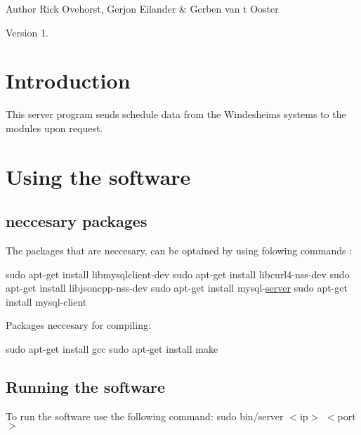 \begin{DoxyAuthor}{Author}
Rick Ovehorst, Gerjon Eilander \& Gerben van \textquotesingle{}t Ooster 
\end{DoxyAuthor}
\begin{DoxyVersion}{Version}
1. 
\end{DoxyVersion}
\hypertarget{index_intro_sec}{}\section{Introduction}\label{index_intro_sec}
This server program sends schedule data from the Windesheim\textquotesingle{}s systems to the modules upon request.\hypertarget{index_compile_sec}{}\section{Using the software}\label{index_compile_sec}
\hypertarget{index_install}{}\subsection{neccesary packages}\label{index_install}
The packages that are neccesary, can be optained by using folowing commands \+: 
\begin{DoxyCode}
sudo apt-\textcolor{keyword}{get} install libmysqlclient-dev
sudo apt-\textcolor{keyword}{get} install libcurl4-nss-dev 
sudo apt-\textcolor{keyword}{get} install libjsoncpp-nss-dev
sudo apt-\textcolor{keyword}{get} install mysql-\hyperlink{main_8h_afd1a82c786509e03b540bae82af2c137}{server}
sudo apt-\textcolor{keyword}{get} install mysql-client
\end{DoxyCode}


Packages neccesary for compiling\+: 
\begin{DoxyCode}
sudo apt-\textcolor{keyword}{get} install gcc
sudo apt-\textcolor{keyword}{get} install make
\end{DoxyCode}
\hypertarget{index_run}{}\subsection{Running the software}\label{index_run}
To run the software use the following command\+: sudo bin/server $<$ip$>$ $<$port$>$ 